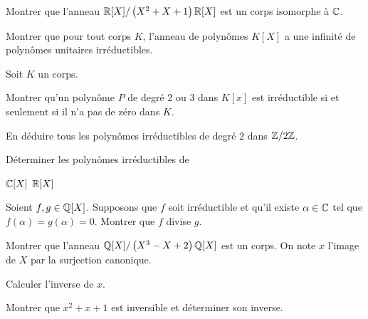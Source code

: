 \documentclass{report}
\begin{document}
\begin{exo}
    Montrer que l'anneau \(\mathbb{R}[X]/\left(X^2+X+1\right)\mathbb{R}[X]\) est un corps isomorphe à \(\mathbb{C}\).
\end{exo}

\begin{exo}
    Montrer que pour tout corps \(K\), l'anneau de polynômes \(K[X]\)
    a une infinité de polynômes unitaires irréductibles.
\end{exo}

\begin{exo}
    Soit \(K\) un corps.
    \begin{q}{1}
        Montrer qu'un polynôme \(P\) de degré 2 ou 3 dans \(K[x]\)
        est irréductible si et seulement si il n'a pas de zéro dans \(K\).
    \end{q}
    \begin{q}{2}
        En déduire tous les polynômes irréductibles de degré \(2\) dans \(\mathbb{Z}/2\mathbb{Z}\).
    \end{q}
\end{exo}

\begin{exo}
    Déterminer les polynômes irréductibles de
    \begin{enumerate}
        \itt \(\mathbb{C}[X]\)
        \itt \(\mathbb{R}[X]\)
    \end{enumerate}
\end{exo}

\begin{exo}
    Soient \(f,g\in \mathbb{Q}[X]\). Supposons que \(f\) soit irréductible et qu'il existe
    \(\alpha\in \mathbb{C}\) tel que \(f(\alpha)=g(\alpha)=0\). Montrer que \(f\) divise \(g\).
\end{exo}

\begin{exo}
    Montrer que l'anneau \(\mathbb{Q}[X]/\left(X^3-X+2\right)\mathbb{Q}[X]\) est un corps. On note
    \(x\) l'image de \(X\) par la surjection canonique.
    \begin{q}{1}
        Calculer l'inverse de \(x\).
    \end{q}
    \begin{q}{2}
        Montrer que \(x^2+x+1\) est inversible et déterminer son inverse.
    \end{q}
\end{exo}
\end{document}
